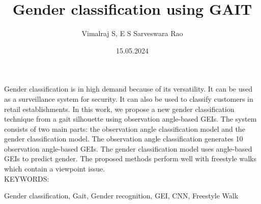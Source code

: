 \documentclass[MTech, hidelinks]{iiitdmdiss}
\begin{document}
\title{Gender classification using GAIT}
\author{Vimalraj S, E S Sarveswara Rao}
\date{15.05.2024}

\maketitle

\declaration


\certificate

\abstract

Gender classification is in high demand because of its
versatility. It can be used as a surveillance system for security. It
can also be used to classify customers in retail establishments. In
this work, we propose a new gender classification technique from
a gait silhouette using observation angle-based GEIs. The system
consists of two main parts: the observation angle classification
model and the gender classification model. The observation angle
classification generates 10 observation angle-based GEIs. The
gender classification model uses angle-based GEIs to predict
gender. The proposed methods perform well with freestyle walks
which contain a viewpoint issue.
\\
\vspace{10pt}
\noindent KEYWORDS: \hspace*{0.5em} \parbox[t]{4.4in}{Gender classification, Gait, Gender recognition, GEI, CNN, Freestyle Walk}


\pagebreak


\begin{singlespace}
\tableofcontents
\thispagestyle{empty}

\listoftables
{}
\listoffigures
{}
\end{singlespace}
\end{document}
